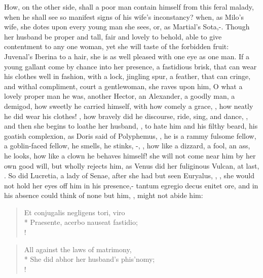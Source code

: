 How, on the other side, shall a poor man contain himself from this
feral malady, when he shall see so manifest signs of his wife's
inconstancy? when, as Milo's wife, she dotes upon every young man she
sees, or, as Martial's Sota,-. Though her husband be proper
and tall, fair and lovely to behold, able to give contentment to any
one woman, yet she will taste of the forbidden fruit: Juvenal's Iberina
to a hair, she is as well pleased with one eye as one man. If a young
gallant come by chance into her presence, a fastidious brisk, that can
wear his clothes well in fashion, with a lock, jingling spur, a
feather, that can cringe, and withal compliment, court a gentlewoman,
she raves upon him, O what a lovely proper man he was, another Hector,
an Alexander, a goodly man, a demigod, how sweetly he carried himself,
with how comely a grace, ,
how neatly he did wear his clothes! , how bravely did he discourse, ride, sing, and
dance, \etc{}, and then she begins to loathe her husband, , to hate him and his filthy beard, his goatish complexion, as
Doris said of Polyphemus, ,
he is a rammy fulsome fellow, a goblin-faced fellow, he smells, he
stinks, -,
\etc{}, how like a dizzard, a fool, an ass, he looks, how like a clown he
behaves himself! she will not come near him by her own good will,
but wholly rejects him, as Venus did her fuliginous Vulcan, at last,
. So did Lucretia,
a lady of Senae, after she had but seen Euryalus, , \etc{}, she would not hold her eyes off him in
his presence,- tantum egregio decus enitet ore, and in his
absence could think of none but him, ,
might not abide him:
%
\begin{latin}%
\begin{verse}%
Et conjugalis negligens tori, viro\\*
Praesente, acerbo nauseat fastidio;\\!
\end{verse}%
\end{latin}%
\translationrule%
\begin{verse}%
All against the laws of matrimony,\\*
She did abhor her husband's phis'nomy;\\!
\end{verse}%

